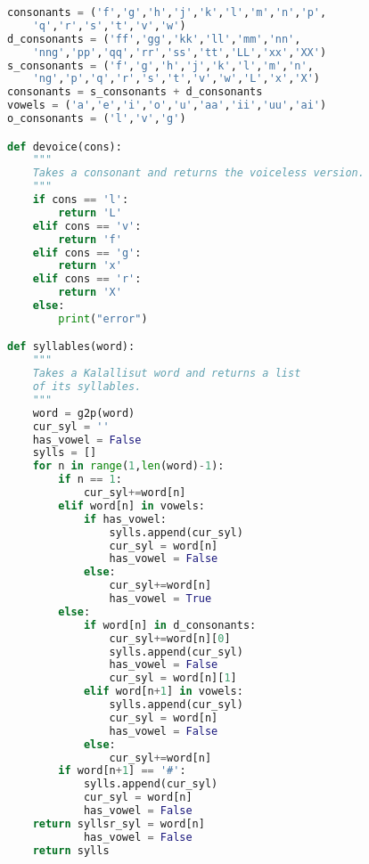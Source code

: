 \documentclass[12pt]{article}
\begin{document}
\begin{lstlisting}[language=Python]
consonants = ('f','g','h','j','k','l','m','n','p',
	'q','r','s','t','v','w')
d_consonants = ('ff','gg','kk','ll','mm','nn',
	'nng','pp','qq','rr','ss','tt','LL','xx','XX')
s_consonants = ('f','g','h','j','k','l','m','n',
	'ng','p','q','r','s','t','v','w','L','x','X')
consonants = s_consonants + d_consonants
vowels = ('a','e','i','o','u','aa','ii','uu','ai')
o_consonants = ('l','v','g')

def devoice(cons):
    """
    Takes a consonant and returns the voiceless version.
    """
    if cons == 'l':
        return 'L'
    elif cons == 'v':
        return 'f'
    elif cons == 'g':
    	return 'x'
    elif cons == 'r':
    	return 'X'
    else:
        print("error")

def syllables(word):
    """
    Takes a Kalallisut word and returns a list
    of its syllables.
    """
    word = g2p(word)
    cur_syl = ''
    has_vowel = False
    sylls = []
    for n in range(1,len(word)-1):
        if n == 1:
            cur_syl+=word[n]
        elif word[n] in vowels:
            if has_vowel:
                sylls.append(cur_syl)
                cur_syl = word[n]
                has_vowel = False
            else:
                cur_syl+=word[n]
                has_vowel = True
        else:
            if word[n] in d_consonants:
                cur_syl+=word[n][0]
                sylls.append(cur_syl)
                has_vowel = False
                cur_syl = word[n][1]
            elif word[n+1] in vowels:
                sylls.append(cur_syl)
                cur_syl = word[n]
                has_vowel = False
            else:
                cur_syl+=word[n]
        if word[n+1] == '#':
            sylls.append(cur_syl)
            cur_syl = word[n]
            has_vowel = False
    return syllsr_syl = word[n]
            has_vowel = False
    return sylls


\end{lstlisting}
\end{document}
